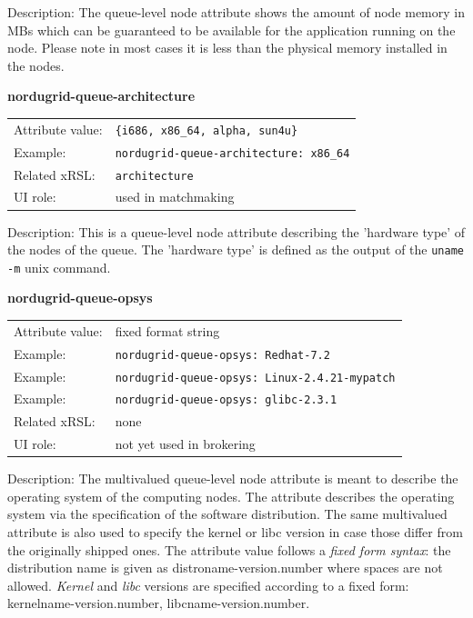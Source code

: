 \documentclass{article}
\begin{document}
Description: The queue-level node attribute shows the amount of node memory in MBs 
which can be guaranteed to be available for the application running on the node. 
Please note in most cases it is less than the physical memory installed in the nodes.


  \hspace*{0.5cm}
  \begin{shaded}
    \textbf{nordugrid-queue-architecture}
  \end{shaded}
  \begin{tabular}{lp{10cm}}  
    Attribute value:& \verb#{i686, x86_64, alpha, sun4u}#\\
    Example:& \verb#nordugrid-queue-architecture: x86_64#\\
    Related xRSL:& \verb#architecture#\\
    UI role:& used in matchmaking \\
  \end{tabular}

Description: This is a queue-level node attribute describing the 'hardware type' of the
nodes of the queue. The 'hardware type' is defined as the output of the \verb#uname -m# unix 
command. 


  \hspace*{0.5cm}
  \begin{shaded}
    \textbf{nordugrid-queue-opsys}
  \end{shaded}
  \begin{tabular}{lp{10cm}}  
    Attribute value:& fixed format string\\
    Example:& \verb#nordugrid-queue-opsys: Redhat-7.2#\\
    Example:& \verb#nordugrid-queue-opsys: Linux-2.4.21-mypatch#\\   
    Example:& \verb#nordugrid-queue-opsys: glibc-2.3.1#\\     
    Related xRSL:& none\\
    UI role:& not yet used in brokering\\
  \end{tabular}


Description: The multivalued queue-level node attribute is meant to describe 
the operating system of the computing nodes. The attribute describes the
operating system via the specification of the software distribution.
The same multivalued attribute is also used to specify the kernel or libc version
in case those differ from the originally shipped ones. 
The attribute value follows a {\it fixed form syntax}:  the distribution name
is given as distroname-version.number where spaces are not allowed.
{\it Kernel} and {\it libc} versions are specified according to a 
fixed form: kernelname-version.number, libcname-version.number. 
\end{document}
